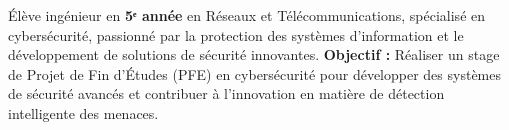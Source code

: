 
\begin{cvparagraph}

  Élève ingénieur en \textbf{5ᵉ année}  en Réseaux et Télécommunications, spécialisé en cybersécurité, passionné par la protection des systèmes d'information et le développement de solutions de sécurité innovantes.
  \newline
  \textbf{Objectif :} Réaliser un stage de Projet de Fin d'Études (PFE) en cybersécurité pour développer des systèmes de sécurité avancés et contribuer à l'innovation en matière de détection intelligente des menaces.

\end{cvparagraph}
